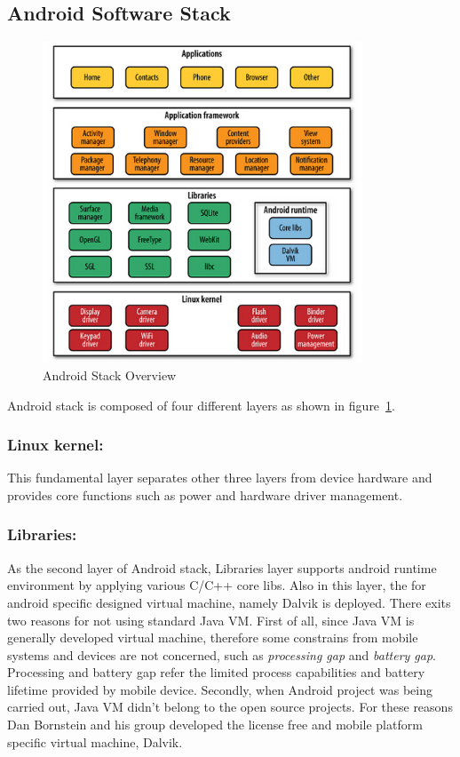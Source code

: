 \subsection{Android Software Stack}
\begin{figure}[!htb]
	\centering
	\includegraphics[width=0.85\textwidth]{android-stack.jpg}
		\caption{Android Stack Overview \cite{learn_android}}
	\label{fig:android-stack}
\end{figure}
Android stack is composed of four different layers as shown in figure~\ref{fig:android-stack}.

\subsubsection{Linux kernel:}This fundamental layer separates other three layers  from  device hardware and provides core functions such as  power and hardware driver management.
\subsubsection{Libraries:}As the second layer of Android stack,  Libraries layer supports android runtime environment by applying various C/C++ core libs.  Also in this layer, the for android specific designed virtual machine, namely Dalvik\cite{learn_android} is deployed. There exits two reasons for not using standard Java VM\cite{learn_android}. First of all, since Java VM is generally developed virtual machine, therefore some constrains from mobile systems and devices are not concerned, such as \emph{processing gap} and \emph{battery gap}\cite{embedded_secure}. Processing and battery gap refer the limited process capabilities and battery lifetime provided by mobile device. Secondly, when Android project was being carried out, Java VM didn't  belong  to the open source projects. For these reasons Dan Bornstein and his group developed the license free and mobile platform specific virtual machine, Dalvik. 

